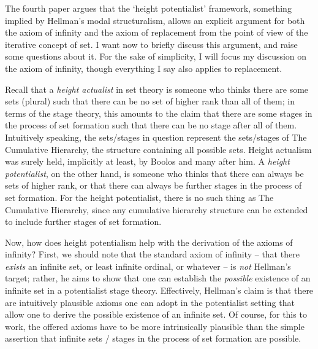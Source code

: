 \documentclass{asl}
\theoremstyle{definition}
\begin{document}
The fourth paper argues that the `height potentialist' 
framework, something implied by Hellman's modal 
structuralism, allows an explicit argument for both 
the axiom of infinity and the axiom of replacement 
from the point of view of the iterative concept of set. 
I want now to briefly discuss this argument, and raise 
some questions about it. For the sake of simplicity, I 
will focus my discussion on the axiom of infinity, though 
everything I say also applies to replacement.

Recall that a \emph{height actualist} in set theory is 
someone who thinks there are some sets (plural) such that 
there can be no set of higher rank than all of them; in 
terms of the stage theory, this amounts to the claim that 
there are some stages in the process of set formation such 
that there can be no stage after all of them. Intuitively 
speaking, the sets/stages in question represent the 
sets/stages of The Cumulative Hierarchy, the structure 
containing all possible sets. Height actualism was surely 
held, implicitly at least, by Boolos and many after him. 
A \emph{height potentialist}, on the other hand, is 
someone who thinks that there can always be sets of 
higher rank, or that there can always be further 
stages in the process of set formation. For 
the height potentialist, there is no such thing as The 
Cumulative Hierarchy, since any cumulative hierarchy 
structure can be extended to include further stages of 
set formation.

Now, how does height potentialism help with the 
derivation of the axioms of infinity? 
First, we should note that the standard axiom of infinity 
-- that there \emph{exists} an infinite set, or 
least infinite ordinal, or whatever -- is \emph{not} 
Hellman's target; rather, he aims to show that one can 
establish the \emph{possible} existence of an infinite 
set in a potentialist stage theory. Effectively, 
Hellman's claim is that there are intuitively 
plausible axioms one can adopt in the potentialist 
setting that allow one to derive the possible 
existence of an infinite set. Of course, for 
this to work, the offered axioms have to be more 
intrinsically plausible than the simple assertion 
that infinite sets / stages in the process of set 
formation are possible.
\end{document}

